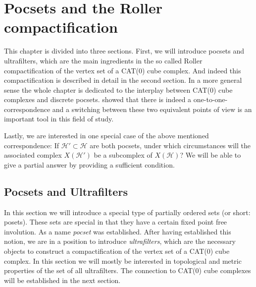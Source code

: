 \section{Pocsets and the Roller compactification}
\label{sec:roller}

This chapter is divided into three sections. First, we will introduce pocsets and ultrafilters, which are the main ingredients in the so called Roller compactification of the vertex set of a CAT(0) cube complex. And indeed this compactification is described in detail in the second section. In a more general sense the whole chapter is dedicated to the interplay between CAT(0) cube complexes and discrete pocsets. \textcite{Roller1999} showed that there is indeed a one-to-one-correspondence and a switching between these two equivalent points of view is an important tool in this field of study.

Lastly, we are interested in one special case of the above mentioned correspondence: If \(\mathcal{H'} \subset \mathcal{H}\) are both pocsets, under which circumstances will the associated complex \(X(\mathcal{H}')\) be a subcomplex of \(X(\mathcal{H})\)? We will be able to give a partial answer by providing a sufficient condition.

\subsection{Pocsets and Ultrafilters}
\label{sec:pocset}

In this section we will introduce a special type of partially ordered sets (or short: posets). These sets are special in that they have a certain fixed point free involution. As a name \emph{pocset} was established. After having established this notion, we are in a position to introduce \emph{ultrafilters}, which are the necessary objects to construct a compactification of the vertex set of a CAT(0) cube complex. In this section we will mostly be interested in topological and metric properties of the set of all ultrafilters. The connection to CAT(0) cube complexes will be established in the next section.

